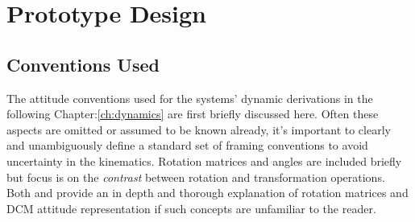 \chapter{Prototype Design}
\label{ch:proto}
\section{Conventions Used}
\label{sec:proto.conventions}
The attitude conventions used for the systems' dynamic derivations in the following Chapter:\ref{ch:dynamics} are first briefly discussed here. Often these aspects are omitted or assumed to be known already, it's important to clearly and unambiguously define a standard set of framing conventions to avoid uncertainty in the kinematics. Rotation matrices and angles are included briefly but focus is on the \emph{contrast} between rotation and transformation operations. Both \cite{spacecraftattitutdequaternions} and \cite{rigidbodylecture} provide an in depth and thorough explanation of rotation matrices and DCM attitude representation if such concepts are unfamiliar to the reader.
